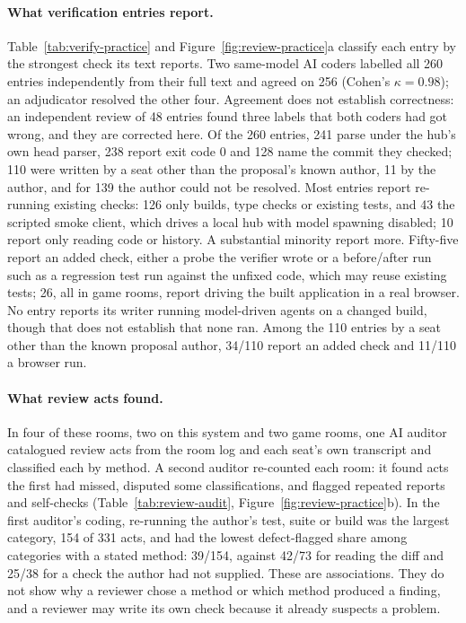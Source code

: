 \paragraph{What verification entries report.} Table~\ref{tab:verify-practice} and Figure~\ref{fig:review-practice}a classify each entry by the strongest check its text reports. Two same-model AI coders labelled all 260 entries independently from their full text and agreed on 256 (Cohen's $\kappa=0.98$); an adjudicator resolved the other four. Agreement does not establish correctness: an independent review of 48 entries found three labels that both coders had got wrong, and they are corrected here. Of the 260 entries, 241 parse under the hub's own head parser, 238 report exit code 0 and 128 name the commit they checked; 110 were written by a seat other than the proposal's known author, 11 by the author, and for 139 the author could not be resolved. Most entries report re-running existing checks: 126 only builds, type checks or existing tests, and 43 the scripted smoke client, which drives a local hub with model spawning disabled; 10 report only reading code or history. A substantial minority report more. Fifty-five report an added check, either a probe the verifier wrote or a before/after run such as a regression test run against the unfixed code, which may reuse existing tests; 26, all in game rooms, report driving the built application in a real browser. No entry reports its writer running model-driven agents on a changed build, though that does not establish that none ran. Among the 110 entries by a seat other than the known proposal author, 34/110 report an added check and 11/110 a browser run.

\begin{table}[t]
\centering
\scriptsize
\caption{The strongest check each structured verification entry reports, by the kind of project its room worked on.}
\label{tab:verify-practice}

\end{table}

\paragraph{What review acts found.} In four of these rooms, two on this system and two game rooms, one AI auditor catalogued review acts from the room log and each seat's own transcript and classified each by method. A second auditor re-counted each room: it found acts the first had missed, disputed some classifications, and flagged repeated reports and self-checks (Table~\ref{tab:review-audit}, Figure~\ref{fig:review-practice}b). In the first auditor's coding, re-running the author's test, suite or build was the largest category, 154 of 331 acts, and had the lowest defect-flagged share among categories with a stated method: 39/154, against 42/73 for reading the diff and 25/38 for a check the author had not supplied. These are associations. They do not show why a reviewer chose a method or which method produced a finding, and a reviewer may write its own check because it already suspects a problem.

